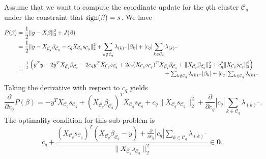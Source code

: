 Assume that we want to compute the coordinate update for the \(q\)th cluster
\(\mathcal{C}_q\) under the constraint that \(\operatorname{sign}(\beta) = s\).
We have
\[
  \begin{aligned}
    P(\beta) & = \frac{1}{2} \lVert y - X\beta\rVert_2^2 + J(\beta)                                                                                                                                                                                                                        \\
             & = \frac{1}{2} \lVert y - X_{\bar{\mathcal{C}_q}} \beta_{\bar{\mathcal{C}_q}} - c_q X_{\mathcal{C}_q} s_{\mathcal{C}_q} \rVert_2^2 + \sum_{k \notin {\mathcal{C}_q}} \lambda_{(k)^-}|\beta_k| + |c_q|\sum_{k \in {\mathcal{C}_q}} \lambda_{(k)^-}                                                                                                                            \\
             & = \splitfrac{\frac{1}{2} \left(y^Ty - 2y^T X_{\bar{\mathcal{C}_q}} \beta_{\bar{\mathcal{C}_q}} - 2 c_q y^T X_{\mathcal{C}_q} s_{\mathcal{C}_q} + 2 c_q (X_{\mathcal{C}_q} s_{\mathcal{C}_q})^T X_{\bar{\mathcal{C}_q}} \beta_{\bar{\mathcal{C}_q}} + \lVert X_{\bar{\mathcal{C}_q}} \beta_{\bar{\mathcal{C}_q}} \rVert_2^2 + c_q^2 \lVert X_{\mathcal{C}_q} s_{\mathcal{C}_q}\rVert_2^2 \right)}{+ \sum_{k \notin {\mathcal{C}_q}} \lambda_{(k)^-}|\beta_k| + |c_q|\sum_{k \in {\mathcal{C}_q}} \lambda_{(k)^-}} \\
  \end{aligned}
\]
Taking the derivative with respect to \(c_q\) yields
\[
  \frac{\partial}{\partial c_q}P(\beta) = -y^T X_{\mathcal{C}_q} s_{\mathcal{C}_q} + (X_{\bar{\mathcal{C}_q}} \beta_{\bar{\mathcal{C}_q}})^T{X_{\mathcal{C}_q} s_{\mathcal{C}_q}} + c_q \lVert X_{\mathcal{C}_q} s_{\mathcal{C}_q} \rVert_2^2 + \frac{\partial}{\partial c_q}|c_q|\sum_{k \in {\mathcal{C}_q}} \lambda_{(k)^-}.
\]
The optimality condition for this sub-problem is
\[
  c_q + \frac{(X_{\mathcal{C}_q} s_{\mathcal{C}_q})^T\left( X_{\bar{\mathcal{C}_q}}\beta_{\bar{\mathcal{C}_q}} - y \right) + \frac{\partial}{\partial c_q}|c_q|\sum_{k \in {\mathcal{C}_q}} \lambda_{(k)^-}}{\lVert X_{\mathcal{C}_q} s_{\mathcal{C}_q} \rVert_2^2} \in \boldsymbol{0}.
\]

